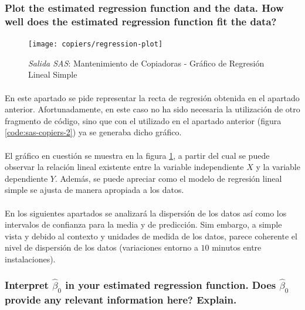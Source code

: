 \documentclass{article}
\begin{document}
      \subsubsection{Plot the estimated regression function and the data. How well does the estimated regression function fit the data?}

        \begin{figure}[H]
          \centering
          \texttt{[image: copiers/regression-plot]}
          \caption{\emph{Salida SAS}: Mantenimiento de Copiadoras - Gráfico de Regresión Lineal Simple}
          \label{img:copiers-regression-plot}
        \end{figure}

        \paragraph{}
        En este apartado se pide representar la recta de regresión obtenida en el apartado anterior. Afortunadamente, en este caso no ha sido necesaria la utilización de otro fragmento de código, sino que con el utilizado en el apartado anterior (figura \ref{code:sas-copiers-2}) ya se generaba dicho gráfico.

        \paragraph{}
        El gráfico en cuestión se muestra en la figura \ref{img:copiers-regression-plot}, a partir del cual se puede observar la relación lineal existente entre la variable independiente $X$ y la variable dependiente $Y$. Además, se puede apreciar como el modelo de regresión lineal simple se ajusta de manera apropiada a los datos.

        \paragraph{}
        En los siguientes apartados se analizará la dispersión de los datos así como los intervalos de confianza para la media y de predicción. Sim embargo, a simple vista y debido al contexto y unidades de medida de los datos, parece coherente el nivel de dispersión de los datos (variaciones entorno a $10$ minutos entre instalaciones).

      \subsubsection{Interpret $\widehat{\beta}_0$ in your estimated regression function. Does $\widehat{\beta}_0$ provide any relevant information here? Explain.}
\end{document}
